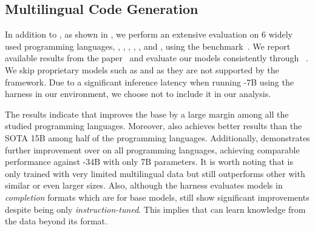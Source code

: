 \subsection{Multilingual Code Generation}

In addition to \python, as shown in , we perform an extensive evaluation on 6 widely used programming languages, \ie \java, \js, \cxx, \php, \swift, and \rust, using the \multiple{} benchmark~\cite{multiple}.
We report available results from the \wizardcoder{} paper~\cite{wizardcoder} and evaluate our models consistently through \bigcodeharness~\cite{bigcode-evaluation-harness}.
We skip proprietary models such as \chatgpt{} and \gptfour{} as they are not supported by the framework.
Due to a significant inference latency when running \wizardcoderc-7B using the harness in our environment, we choose not to include it in our analysis.

The results indicate that \modelc{} improves the base  by a large margin among all the studied programming languages.
Moreover, \modelc{} also achieves better results than the SOTA 15B \wizardcodersc{} among half of the programming languages.
Additionally, \modelxc{} demonstrates further improvement over \modelc{} on all programming languages, achieving comparable performance against \wizardcoderc-34B with only 7B parameters.
It is worth noting that \modelc{} is only trained with very limited multilingual data but still outperforms other  with similar or even larger sizes.
Also, although the harness evaluates models in \emph{completion} formats which are for base models,  still show significant improvements despite being only \emph{instruction-tuned}. This implies that  can learn knowledge from the data beyond its format.

